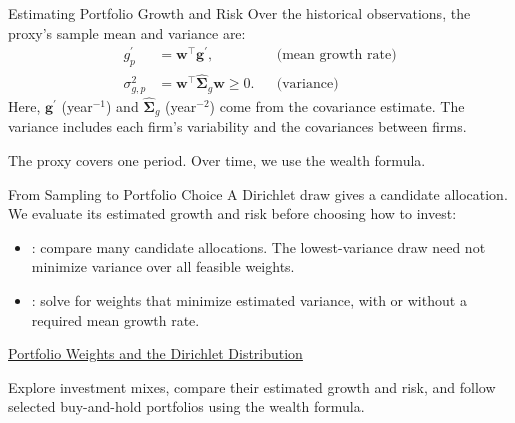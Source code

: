 \documentclass[aspectratio=169,11pt]{beamer}
\newcommand{\bw}{\mathbf{w}}
\newcommand{\bg}{\mathbf{g}}
\newcommand{\Sg}{\hat{\boldsymbol{\Sigma}}_{g}}
\begin{document}
\begin{frame}{Estimating Portfolio Growth and Risk}
  Over the historical observations, the proxy's sample mean and variance are:
  \[
    \begin{aligned}
      g^{\prime}_p&=\bw^{\top}\bg^{\prime}, &&\text{(mean growth rate)}\\[0.4em]
      \sigma_{g,p}^2&=\bw^{\top}\Sg\bw\ge0. &&\text{(variance)}
    \end{aligned}
  \]
  Here, $\bg^{\prime}$ (year$^{-1}$) and $\Sg$ (year$^{-2}$) come from the
  covariance estimate. The variance includes each firm's variability and the
  covariances between firms.

  \vspace{0.6em}
  The proxy covers one period. Over time, we use the wealth formula.
\end{frame}

\begin{frame}{From Sampling to Portfolio Choice}
  A Dirichlet draw gives a candidate allocation. We evaluate its estimated
  growth and risk before choosing how to invest:

  \vspace{0.5em}
  \begin{itemize}\setlength{\itemsep}{0.7em}
    \item {}: compare many candidate allocations. The
      lowest-variance draw need not minimize variance over all feasible weights.
    \item {}: solve for weights that minimize
      estimated variance, with or without a required mean growth rate.
  \end{itemize}

  \vspace{0.8em}
  \textbf{}
  \href{https://github.com/varnerlab/CHEME-5660-CourseRepository-Fall-2026/blob/main/lectures/week-5/L5b/CHEME-5660-L5b-Example-Dirichlet-PortfolioWeights-Fall-2026.ipynb}{Portfolio Weights and the Dirichlet Distribution}

  Explore investment mixes, compare their estimated growth and risk, and
  follow selected buy-and-hold portfolios using the wealth formula.
\end{frame}
\end{document}
